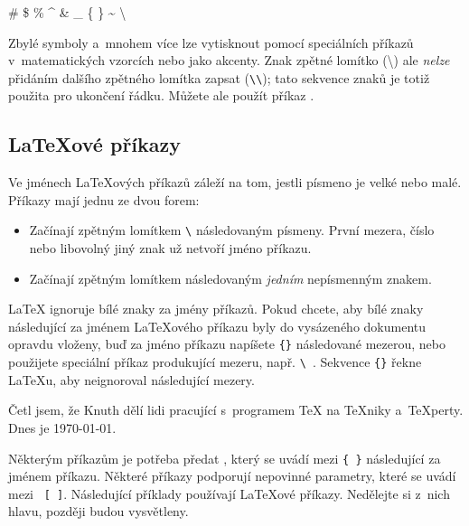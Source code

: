 \begin{example}
\# \$ \% \^{} \& \_ \{ \} \~{}
\textbackslash
\end{example}

Zbylé symboly a~mnohem více lze vytisknout pomocí speciálních
příkazů v~matematických vzorcích nebo jako akcenty. Znak
zpětné lomítko (\textbackslash{}) ale \emph{nelze} přidáním dalšího
zpětného lomítka zapsat (\verb|\\|); tato sekvence znaků
je totiž použita pro ukončení řádku. Můžete ale použít příkaz
.

\subsection{\LaTeX ové příkazy}

Ve jménech \LaTeX ových příkazů záleží na tom, jestli písmeno
je velké nebo malé. Příkazy mají jednu ze dvou forem:

\begin{itemize}
\item Začínají zpětným lomítkem \verb|\| následovaným písmeny.
 První mezera, číslo nebo libovolný jiný  znak už netvoří
 jméno příkazu.
\item Začínají zpětným lomítkem následovaným \emph{jedním} nepísmenným
  znakem.
\end{itemize}

%
%

%
%
\label{mezery}

\LaTeX{} ignoruje bílé znaky za jmény příkazů. Pokud chcete, aby bílé
znaky následující za jménem \LaTeX ového příkazu byly do vysázeného
dokumentu opravdu vloženy,
buď za jméno příkazu napíšete \verb|{}| následované mezerou, nebo
použijete speciální příkaz produkující mezeru, např. \verb*+\ +. Sekvence \verb|{}| řekne \LaTeX u,
aby neignoroval následující mezery.

\begin{example}
Četl jsem, že Knuth dělí
lidi pracující s~programem
\TeX{} na \TeX{}niky
a~\TeX perty.\\
Dnes je \today.
\end{example}

Některým příkazům je potřeba předat , který se uvádí mezi
 \verb|{ }| následující za jménem příkazu. Některé
příkazy podporují nepovinné parametry, které se uvádí mezi
~\verb|[ ]|. Následující příklady používají \LaTeX ové
příkazy. Nedělejte si z~nich hlavu, později budou vysvětleny.

